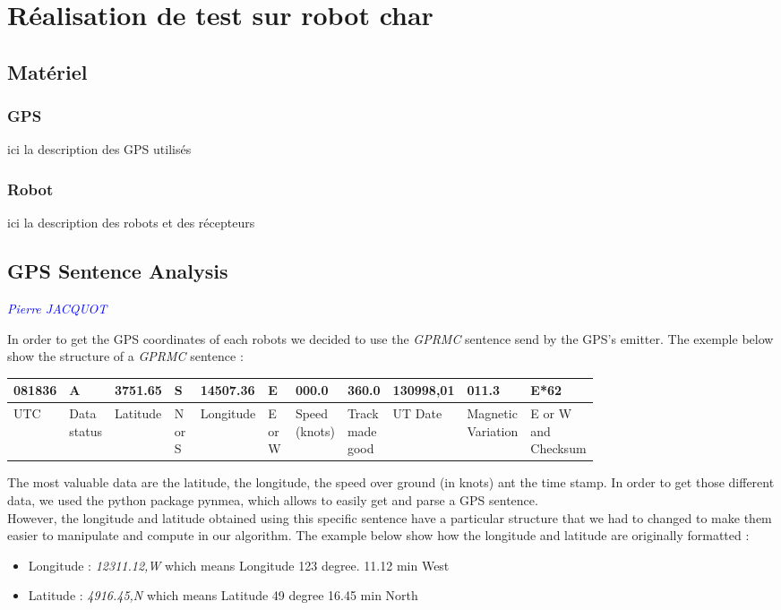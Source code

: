\chapter{Réalisation de test sur robot char}
\section{Matériel}
\subsection{GPS}
ici la description des GPS utilisés
\subsection{Robot}
ici la description des robots et des récepteurs
\section{GPS Sentence Analysis}
\textcolor{blue}{\textit{Pierre JACQUOT}}

In order to get the GPS coordinates of each robots we decided to use the \textit{GPRMC} sentence send by the GPS's emitter. The exemple below show the structure of a \textit{GPRMC} sentence : \
\begin{center}
\begin{tabular}{|m{0.05\linewidth}|m{0.06\linewidth}|m{0.07\linewidth}|m{0.07\linewidth}|m{0.08\linewidth}|m{0.07\linewidth}|m{0.07\linewidth}|m{0.04\linewidth}|m{0.08\linewidth}|m{0.1\linewidth}|m{0.07\linewidth}|}
\hline
    081836 & A & 3751.65 & S & 14507.36 & E & 000.0 & 360.0 & 130998,01 & 011.3 & E*62  \\ \hline
     UTC & Data status & Latitude & N or S & Longitude & E or W & Speed (knots) & Track made good &  UT Date & Magnetic Variation & E or W and Checksum \\ \hline

\end{tabular}
\end{center}

The most valuable data are the latitude, the longitude, the speed over ground (in knots) ant the time stamp. In order to get those different data, we used the python package pynmea, which allows to easily get and parse a GPS sentence. \\
However, the longitude and latitude obtained using this specific sentence have a particular structure that we had to changed to make them easier to manipulate and compute in our algorithm. The example below show how the longitude and latitude are originally formatted :
\\
\begin{itemize}
  \item Longitude  : \textit{12311.12,W} which means Longitude 123 degree. 11.12 min West
  \item Latitude : \textit{4916.45,N} which means Latitude 49 degree 16.45 min North
\end{itemize}

